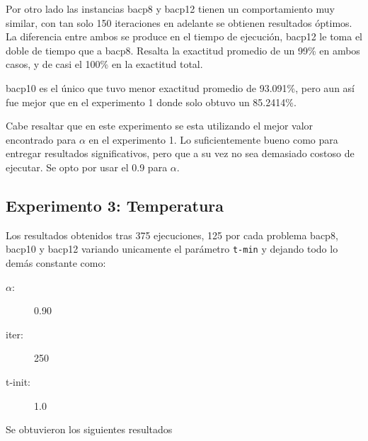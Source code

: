 \documentclass[letterpaper,10pt]{article}
\begin{document}
Por otro lado las instancias bacp8 y bacp12 tienen un comportamiento muy similar, con tan solo 150 iteraciones en adelante se obtienen resultados óptimos. La diferencia entre ambos se produce en el tiempo de ejecución, bacp12 le toma el doble de tiempo que a bacp8. Resalta la exactitud promedio de un 99\% en ambos casos, y de casi el 100\% en la exactitud total.

bacp10 es el único que tuvo menor exactitud promedio de 93.091\%, pero aun así fue mejor que en el experimento 1 donde solo obtuvo un 85.2414\%.

Cabe resaltar que en este experimento se esta utilizando el mejor valor encontrado para $\alpha$ en el experimento 1. Lo suficientemente bueno como para entregar resultados significativos, pero que a su vez no sea demasiado costoso de ejecutar. Se opto por usar el 0.9 para $\alpha$.





\subsection{Experimento 3: Temperatura}

Los resultados obtenidos tras 375 ejecuciones, 125 por cada problema bacp8, bacp10 y bacp12 variando unicamente el parámetro \texttt{t-min} y dejando todo lo demás constante como:

\begin{description}
    \item[$\alpha$:] 0.90
    \item[iter:] 250
    \item[t-init:] 1.0
\end{description}
Se obtuvieron los siguientes resultados
\end{document}
